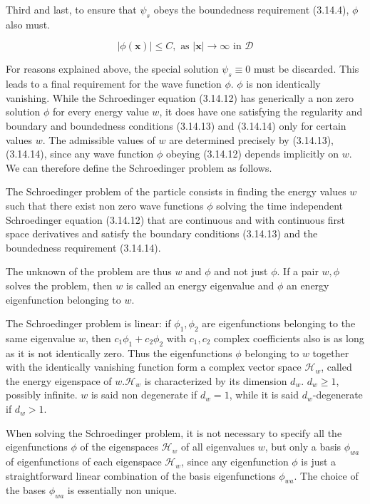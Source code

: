 \documentclass{article}
\begin{document}
Third and last, to ensure that $\psi_{s}$ obeys the boundedness requirement (3.14.4), $\phi$ also must.
 
\begin{equation*}
|\phi(\boldsymbol{x})| \leq C, \text { as }|\boldsymbol{x}| \rightarrow \infty \text { in } \mathcal{D} \tag{3.14.14}
\end{equation*}
 

For reasons explained above, the special solution $\psi_{s} \equiv 0$ must be discarded. This leads to a final requirement for the wave function $\phi$.
$\phi$ is non identically vanishing.
While the Schroedinger equation (3.14.12) has generically a non zero solution $\phi$ for every energy value $w$, it does have one satisfying the regularity and boundary and boundedness conditions (3.14.13) and (3.14.14) only for certain values $w$. The admissible values of $w$ are determined precisely by (3.14.13), (3.14.14), since any wave function $\phi$ obeying (3.14.12) depends implicitly on $w$. We can therefore define the Schroedinger problem as follows.

The Schroedinger problem of the particle consists in finding the energy values $w$ such that there exist non zero wave functions $\phi$ solving the time independent Schroedinger equation (3.14.12) that are continuous and with continuous first space derivatives and satisfy the boundary conditions (3.14.13) and the boundedness requirement (3.14.14).

The unknown of the problem are thus $w$ and $\phi$ and not just $\phi$. If a pair $w, \phi$ solves the problem, then $w$ is called an energy eigenvalue and $\phi$ an energy eigenfunction belonging to $w$.

The Schroedinger problem is linear: if $\phi_{1}, \phi_{2}$ are eigenfunctions belonging to the same eigenvalue $w$, then $c_{1} \phi_{1}+c_{2} \phi_{2}$ with $c_{1}, c_{2}$ complex coefficients also is as long as it is not identically zero. Thus the eigenfunctions $\phi$ belonging to $w$ together with the identically vanishing function form a complex vector space $\mathcal{H}_{w}$, called the energy eigenspace of $w . \mathcal{H}_{w}$ is characterized by its dimension $d_{w}$. $d_{w} \geq 1$, possibly infinite. $w$ is said non degenerate if $d_{w}=1$, while it is said $d_{w}$-degenerate if $d_{w}>1$.

When solving the Schroedinger problem, it is not necessary to specify all the eigenfunctions $\phi$ of the eigenspaces $\mathcal{H}_{w}$ of all eigenvalues $w$, but only a basis $\phi_{w a}$ of eigenfunctions of each eigenspace $\mathcal{H}_{w}$, since any eigenfunction $\phi$ is just a straightforward linear combination of the basis eigenfunctions $\phi_{w a}$. The choice of the bases $\phi_{w a}$ is essentially non unique.
\end{document}
